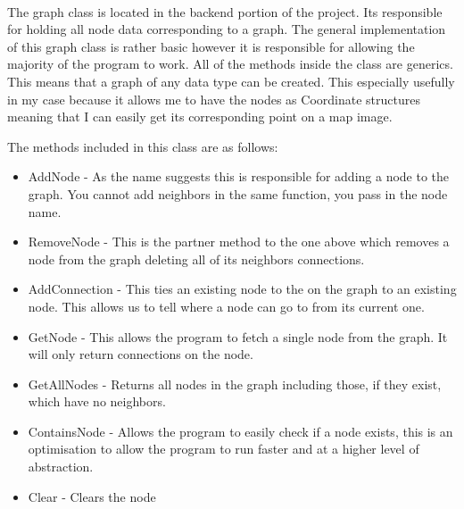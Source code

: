 \begin{FlushLeft}
    \begin{figure}[H]
        \centering
    \end{figure}\\

    The graph class is located in the backend portion of the project. Its responsible for holding all node data corresponding to a graph. The general implementation of this graph class is rather basic however it is responsible for allowing the majority of the program to work. All of the methods inside the class are generics. This means that a graph of any data type can be created. This especially usefully in my case because it allows me to have the nodes as Coordinate structures meaning that I can easily get its corresponding point on a map image. \\ \bk

    The methods included in this class are as follows:
    \begin{itemize}
        \item AddNode - As the name suggests this is responsible for adding a node to the graph. You cannot add neighbors in the same function, you pass in the node name.
        \item RemoveNode - This is the partner method to the one above which removes a node from the graph deleting all of its neighbors connections.
        \item AddConnection - This ties an existing node to the on the graph to an existing node. This allows us to tell where a node can go to from its current one.
        \item GetNode - This allows the program to fetch a single node from the graph. It will only return connections on the node.
        \item GetAllNodes - Returns all nodes in the graph including those, if they exist, which have no neighbors.
        \item ContainsNode - Allows the program to easily check if a node exists, this is an optimisation to allow the program to run faster and at a higher level of abstraction.
        \item Clear - Clears the node
    \end{itemize}


\end{FlushLeft}
